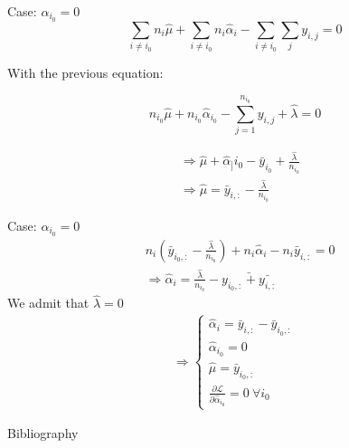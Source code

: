 \documentclass[unknownkeysallowed]{beamer}
\begin{document}
\begin{frame}{Case: $\alpha_{i_0}=0$}
\[\sum\limits_{i\ne i_0}n_i\hat{\mu}+\sum\limits_{i\ne i_0}n_i\hat{\alpha}_i-\sum\limits_{i\ne i_0}\sum\limits_{j}y_{i,j}=0\]

With the previous equation:

\[n_{i_0}\hat{\mu}+n_{i_0}\hat{\alpha}_{i_0}-\sum\limits_{j=1}^{n_{i_0}}y_{i,j}+\hat{\lambda}=0\]

\begin{align*}
&\Longrightarrow \hat{\mu}+\hat{\alpha}_]{i_0}-\bar{y}_{i_0}+\frac{\hat{\lambda}}{n_{i_0}}\\
&\Longrightarrow \hat{\mu}=\bar{y}_{i,:}-\frac{\hat{\lambda}}{n_{i_0}}
\end{align*}
\end{frame}

\begin{frame}{Case: $\alpha_{i_0}=0$}
\begin{align*}
&n_i(\bar{y}_{i_0,:}-\frac{\hat{\lambda}}{n_{i_0}})+n_i\hat{\alpha}_i-n_i\bar{y}_{i,:}=0\\
&\Longrightarrow \hat{\alpha}_i=\frac{\hat{\lambda}}{n_{i_0}}-\bar{y_{i_0,:}+\bar{y_{i,:}}}
\end{align*}
We admit that $\hat{\lambda}=0$
\begin{align*}
    \Longrightarrow \begin{cases}
\hat{\alpha}_i=\bar{y}_{i,:}-\bar{y}_{i_0,:} \\
\hat{\alpha}_{i_0}=0\\
\hat{\mu}=\bar{y}_{i_0,:}\\
\frac{\partial \mathcal{L}}{\partial \hat\alpha_{i_0}}=0\ \forall i_0
\end{cases}
\end{align*}
\end{frame}


\begin{frame}{Bibliography}
\nocite{*}
\printbibliography
\end{frame}
\end{document}
